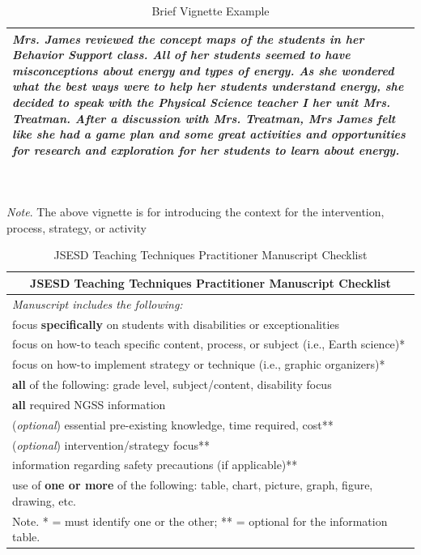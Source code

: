 \documentclass[11.5pt]{sig-alternate} %
\begin{document}
\begin{large}
\begin{table}
\caption{Brief Vignette Example}
\begin{tabular}{|l|}
\hline
\textit{Mrs. James reviewed the concept maps of the students in her Behavior Support class.  All of her students seemed to have misconceptions about energy and types of energy.  As she wondered what the best ways were to help her students understand energy, she decided to speak with the Physical Science teacher I her unit Mrs. Treatman.  After a discussion with Mrs. Treatman, Mrs James felt like she had a game plan and some great activities and opportunities for research and exploration for her students to learn about energy.} \\ \hline
\end{tabular}
\\ \\
\textit{Note}. The above vignette is for introducing the context for the intervention, process, strategy, or activity
\end{table}

\begin{table}
\caption{JSESD Teaching Techniques Practitioner Manuscript Checklist}
\begin{tabular}{l}
\hline
\multicolumn{1}{c}{\textbf{JSESD Teaching Techniques Practitioner Manuscript Checklist}} \\ \hline
\textit{Manuscript includes the following:} \\ \hline
focus \textbf{specifically} on students with disabilities or exceptionalities \\
focus on how-to teach specific content, process, or subject (i.e., Earth science)* \\
focus on how-to implement strategy or technique (i.e., graphic organizers)* \\
\textbf{all} of the following: grade level, subject/content, disability focus \\
\textbf{all} required NGSS information \\
(\textit{optional}) essential pre-existing knowledge, time required, cost** \\
(\textit{optional}) intervention/strategy focus** \\
information regarding safety precautions (if applicable)** \\
use of \textbf{one or more} of the following: table, chart, picture, graph, figure, drawing, etc. \\ \hline
Note. * = must identify one or the other; ** = optional for the information table. \\
\end{tabular}
\end{table}
\end{large}
\clearpage
\end{document}
